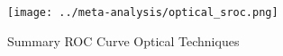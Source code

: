 \begin{figure}[p]
\centering

\texttt{[image: ../meta-analysis/optical\_sroc.png]}

\caption[Summary ROC Curve Optical Techniques]{Summary ROC Curve Optical Techniques}
\label{fig:frozen_sroc}
\end{figure}
